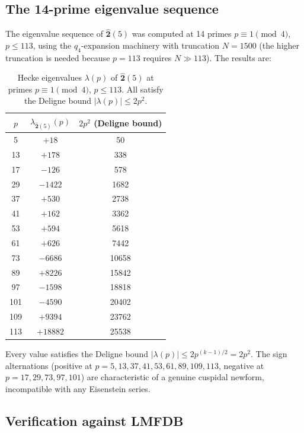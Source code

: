 \documentclass[12pt]{amsart}
\theoremstyle{definition}
\newcommand{\hhat}[1]{\widehat{\mathbf{#1}}}  %
\begin{document}
\subsection{The 14-prime eigenvalue sequence}

The eigenvalue sequence of $\hhat{2}(5)$ was computed at
14 primes $p\equiv 1\pmod{4}$, $p\le 113$, using the
$q_4$-expansion machinery with truncation $N=1500$
(the higher truncation is needed because $p=113$ requires
$N \gg 113$).  The results are:

\begin{table}[ht]
\centering
\caption{Hecke eigenvalues $\lambda(p)$ of $\hhat{2}(5)$ at primes
         $p\equiv 1\pmod{4}$, $p \le 113$.  All satisfy the Deligne
         bound $|\lambda(p)|\le 2p^2$.}
\label{tab:2hat5-eigenvalues}
\begin{tabular}{@{}ccc@{}}
  \toprule
  $p$ & $\lambda_{\hhat{2}(5)}(p)$ & $2p^2$ (Deligne bound) \\
  \midrule
  5   & $+18$    & 50      \\
  13  & $+178$   & 338     \\
  17  & $-126$   & 578     \\
  29  & $-1422$  & 1682    \\
  37  & $+530$   & 2738    \\
  41  & $+162$   & 3362    \\
  53  & $+594$   & 5618    \\
  61  & $+626$   & 7442    \\
  73  & $-6686$  & 10658   \\
  89  & $+8226$  & 15842   \\
  97  & $-1598$  & 18818   \\
  101 & $-4590$  & 20402   \\
  109 & $+9394$  & 23762   \\
  113 & $+18882$ & 25538   \\
  \bottomrule
\end{tabular}
\end{table}

Every value satisfies the Deligne bound $|\lambda(p)|\le 2p^{(k-1)/2}=2p^2$.
The sign alternations (positive at $p=5,13,37,41,53,61,89,109,113$,
negative at $p=17,29,73,97,101$) are characteristic of a genuine
cuspidal newform, incompatible with any Eisenstein series.

\subsection{Verification against LMFDB}
\end{document}

